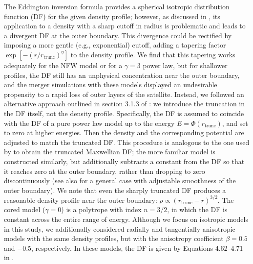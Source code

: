 \documentclass[twocolumn]{aastex63}
\begin{document}
The Eddington inversion formula provides a spherical isotropic distribution function (DF) for the given density profile; however, as discussed in \citet{Lacroix2018}, its application to a density with a sharp cutoff in radius is problematic and leads to a divergent DF at the outer boundary. This divergence could be rectified by imposing a more gentle (e.g., exponential) cutoff, adding a tapering factor $\exp[-(r/r_\mathrm{trunc})^\eta]$ to the density profile. We find that this tapering works adequately for the NFW model or for a $\gamma=3$ power law, but for shallower profiles, the DF still has an unphysical concentration near the outer boundary, and the merger simulations with these models displayed an undesirable propensity to a rapid loss of outer layers of the satellite. Instead, we followed an alternative approach outlined in section 3.1.3 of \citet{Lacroix2018}: we introduce the truncation in the DF itself, not the density profile. 
Specifically, the DF is assumed to coincide with the DF of a pure power law model up to the energy $E=\Phi(r_\mathrm{trunc})$, and set to zero at higher energies. Then the density and the corresponding potential are adjusted to match the truncated DF. This procedure is analogous to the one used by \citet{Woolley1954} to obtain the truncated Maxwellian DF; the more familiar \citet{King1966} model is constructed similarly, but additionally subtracts a constant from the DF so that it reaches zero at the outer boundary, rather than dropping to zero discontinuously (see also \citealt{Gieles2015} for a general case with adjustable smoothness of the outer boundary). We note that even the sharply truncated DF produces a reasonable density profile near the outer boundary: $\rho \propto (r_\mathrm{trunc}-r)^{3/2}$. The cored model ($\gamma=0$) is a polytrope with index $n=3/2$, in which the DF is constant across the entire range of energy. Although we focus on isotropic models in this study, we additionally considered radially and tangentially anisotropic models with the same density profiles, but with the anisotropy coefficient $\beta=0.5$ and $-0.5$, respectively. In these models, the DF is given by %
Equations 4.62--4.71 in \citet{Binney2008}.
\end{document}

